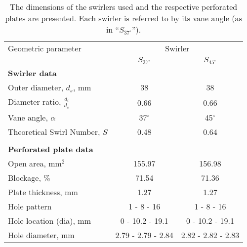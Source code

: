 \begin{table}

\caption[Swirler Dimensions]{The dimensions of the swirlers used and the respective perforated plates are presented. Each swirler is referred to by its vane angle (as in ``\(S_{37^\circ}\)'').}

\begin{center}
\begin{tabular}{lcc}
  Geometric parameter & \multicolumn{2}{c}{Swirler} \tabularnewline
  & \(S_{37^\circ}\) & \(S_{45^\circ}\) \tabularnewline
  \hline \hline
  \textbf{Swirler data} & & \tabularnewline
  Outer diameter, \(d_s\), mm & 38 & 38 \tabularnewline
  Diameter ratio, \(\frac{d_i}{d_s}\) & 0.66 & 0.66 \tabularnewline
  Vane angle, \(\alpha\) & 37\(^\circ\) & 45\(^\circ\) \tabularnewline
  Theoretical Swirl Number, \(S\) & 0.48 & 0.64 \tabularnewline
  & & \tabularnewline
  \textbf{Perforated plate data} & & \tabularnewline
  Open area, mm\(^2\) & 155.97 & 156.98 \tabularnewline
  Blockage, \% & 71.54 & 71.36 \tabularnewline
  Plate thickness, mm & 1.27 & 1.27 \tabularnewline
  Hole pattern & 1 - 8 - 16 & 1 - 8 - 16 \tabularnewline
  Hole location (dia), mm & 0 - 10.2 - 19.1 & 0 - 10.2 - 19.1 \tabularnewline
  Hole diameter, mm & 2.79 - 2.79 - 2.84 & 2.82 - 2.82 - 2.83 \tabularnewline
\end{tabular}
\end{center}

\label{tab:swirlerDimensions}

\end{table}


